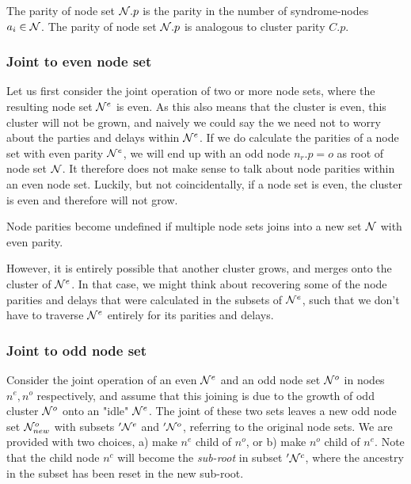 \begin{lemma}
  The parity of node set $\mathcal{N}.p$ is the parity in the number of syndrome-nodes $a_i \in \mathcal{N}$. The parity of node set $\mathcal{N}.p$ is analogous to cluster parity $C.p$.
\end{lemma}

\subsubsection{Joint to even node set}

Let us first consider the joint operation of two or more node sets, where the resulting node set $\mathcal{N}^{e}$ is even. As this also means that the cluster is even, this cluster will not be grown, and naively we could say the we need not to worry about the parties and delays within $\mathcal{N}^{e}$. If we do calculate the parities of a node set with even parity $\mathcal{N}^e$, we will end up with an odd node $n_r.p=o$ as root of node set $\mathcal{N}$. It therefore does not make sense to talk about node parities within an even node set. Luckily, but not coincidentally, if a node set is even, the cluster is even and therefore will not grow.

\begin{lemma}\label{lem:nodecalc_even}
  Node parities become undefined if multiple node sets joins into a new set $\mathcal{N}$ with even parity.
\end{lemma}

However, it is entirely possible that another cluster grows, and merges onto the cluster of $\mathcal{N}^{e}$. In that case, we might think about recovering some of the node parities and delays that were calculated in the subsets of $\mathcal{N}^e$, such that we don't have to traverse $\mathcal{N}^{e}$ entirely for its parities and delays.

\subsubsection{Joint to odd node set}

Consider the joint operation of an even $\mathcal{N}^e$ and an odd node set $\mathcal{N}^o$ in nodes $n^e, n^o$ respectively, and assume that this joining is due to the growth of odd cluster $\mathcal{N}^o$ onto an "idle" $\mathcal{N}^e$. The joint of these two sets leaves a new odd node set $\mathcal{N}_{new}^o$ with subsets $'\mathcal{N}^e$ and $'\mathcal{N}^o$, referring to the original node sets. We are provided with two choices, a) make $n^e$ child of $n^o$, or b) make $n^o$ child of $n^e$. Note that the child node $n^c$ will become the \emph{sub-root} in subset $'\mathcal{N}^c$, where the ancestry in the subset has been reset in the new sub-root. 

